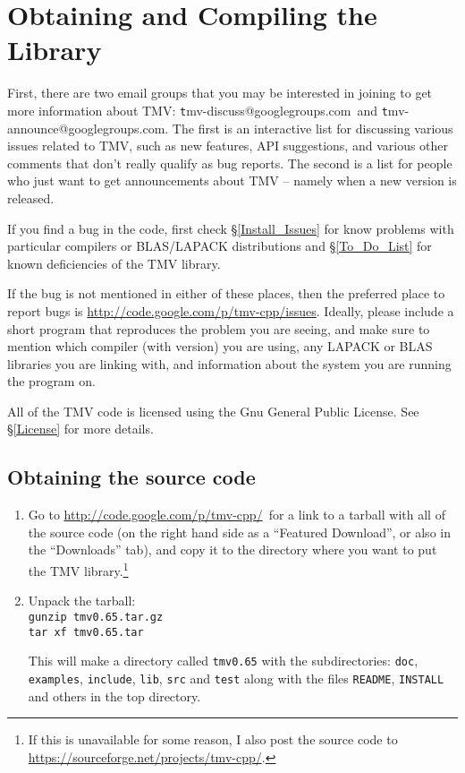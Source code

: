 \documentclass[twoside,letterpaper,11pt]{article}
\makeatletter
\newcommand{\tmvversion}{0.65}
\newcommand{\mygroupx}{tmv-discuss@googlegroups.com}
\newcommand{\mygrouptt}{\texttt \mygroupx}
\newcommand{\mygroupannx}{tmv-announce@googlegroups.com}
\newcommand{\mygroupann}{\texttt \mygroupannx}
\newcommand{\myissuesx}{http://code.google.com/p/tmv-cpp/issues}
\newcommand{\myissues}{\url{\myissuesx}}
\newcommand{\websitex}{http://code.google.com/p/tmv-cpp/}
\newcommand{\website}{\url{\websitex}}
\newcommand{\altwebsitex}{https://sourceforge.net/projects/tmv-cpp/}
\newcommand{\altwebsite}{\url{\altwebsitex}}
\renewcommand{\tt}[1]{{\lstinline {#1}}}
\makeatother
\begin{document}
\newpage
\section{Obtaining and Compiling the Library}
\label{Install}

First, there are two email groups that you may be interested in joining to get more 
information about TMV:
\mygrouptt\ and \mygroupann.
The first is an interactive list for discussing various issues related to TMV, such as 
new features, API suggestions, and various other comments that don't really qualify
as bug reports.  The second is a list for people who just want to get announcements 
about TMV -- namely when a new version is released.

If you find a bug in the code, first check \S\ref{Install_Issues} for know problems with 
particular compilers or BLAS/LAPACK distributions and \S\ref{To_Do_List} for known
deficiencies of the TMV library.

If the bug is not mentioned in either of these places, then the preferred place to report 
bugs is \myissues.  Ideally, please include a short program that reproduces the problem
you are seeing, and make sure to mention which compiler (with version) you are using,
any LAPACK or BLAS libraries you are linking with, and information about the system 
you are running the program on. 

All of the TMV code is licensed using the Gnu General Public License.  See 
\S\ref{License} for more details.

\subsection{Obtaining the source code}
\label{Install_Obtain}


\begin{enumerate}

\item
Go to \website\ for a link to a tarball with all of the source code (on the right hand side as a
``Featured Download'', or also in the ``Downloads'' tab), and copy
it to the directory where you want to put the TMV library.\footnote{
If this is unavailable for some reason, I also post the source code to \altwebsite.}

\item
Unpack the tarball:\\
\texttt{gunzip tmv\tmvversion .tar.gz}\\
\texttt{tar xf tmv\tmvversion .tar}

This will make a directory called \texttt{tmv\tmvversion} with the subdirectories:
\texttt{doc}, \texttt{examples}, \texttt{include}, \texttt{lib}, \texttt{src} and \texttt{test} 
along with the files \tt{README}, \tt{INSTALL} and others
in the top directory.

\end{enumerate}
\end{document}

